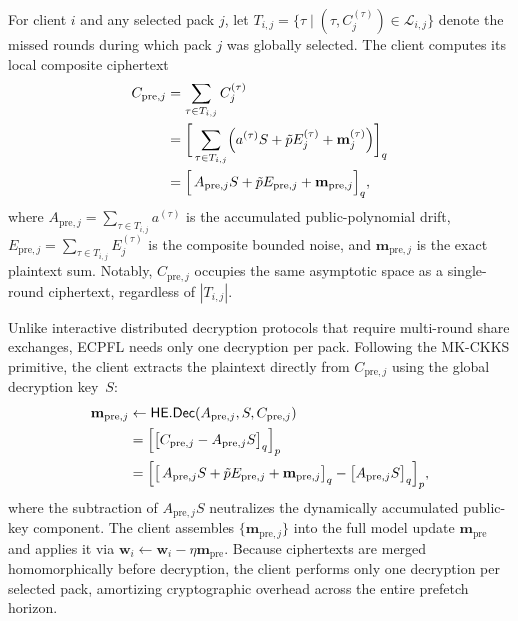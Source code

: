 \documentclass[10pt,conference]{IEEEtran}
\begin{document}
For client $i$ and any selected pack $j$, let $T_{i,j} = \{\tau \mid (\tau, C_j^{(\tau)}) \in \mathcal{L}_{i,j}\}$ denote the missed rounds during which pack $j$ was globally selected.
The client computes its local composite ciphertext
\begin{equation}
\begin{aligned}
    C_{\mathrm{pre},j} &= \sum_{\tau \in T_{i,j}} C_{j}^{(\tau)} \\
    &= \biggl[\, \sum_{\tau \in T_{i,j}} \Bigl( a^{(\tau)} S + \tilde{p} E_j^{(\tau)} + \mathbf{m}_j^{(\tau)} \Bigr) \biggr]_{q} \\
    &= \Bigl[\, A_{\mathrm{pre},j} S + \tilde{p} E_{\mathrm{pre},j} + \mathbf{m}_{\mathrm{pre}, j} \Bigr]_{q},
    \label{eq:prefetch-accumulation}
\end{aligned}
\end{equation}
where $A_{\mathrm{pre},j} = \sum_{\tau \in T_{i,j}} a^{(\tau)}$ is the accumulated public-polynomial drift, $E_{\mathrm{pre},j} = \sum_{\tau \in T_{i,j}} E_j^{(\tau)}$ is the composite bounded noise, and $\mathbf{m}_{\mathrm{pre}, j}$ is the exact plaintext sum.
Notably, $C_{\mathrm{pre},j}$ occupies the same asymptotic space as a single-round ciphertext, regardless of $|T_{i,j}|$.

Unlike interactive distributed decryption protocols that require multi-round share exchanges, \textsc{ECPFL} needs only one decryption per pack.
Following the MK-CKKS primitive, the client extracts the plaintext directly from $C_{\mathrm{pre},j}$ using the global decryption key~$S$:
\begin{equation}
\begin{aligned}
 \mathbf{m}_{\mathrm{pre},j}
& \leftarrow \mathsf{HE.Dec}(A_{\mathrm{pre},j}, S, C_{\mathrm{pre},j})\\
&= \Bigl[\bigl[ C_{\mathrm{pre},j} - A_{\mathrm{pre},j} S \bigr]_{q}\Bigr]_{p} \\
&=\Bigl[\bigl[\, A_{\mathrm{pre},j} S + \tilde{p} E_{\mathrm{pre},j} + \mathbf{m}_{\mathrm{pre},j} \bigr]_{q} - \bigl[ A_{\mathrm{pre},j} S\bigr]_q\Bigr]_p,
\end{aligned}
\label{eq:one-shot-dec}
\end{equation}
where the subtraction of $A_{\mathrm{pre},j} S$ neutralizes the dynamically accumulated public-key component.
The client assembles $\{\mathbf{m}_{\mathrm{pre},j}\}$ into the full model update $\mathbf{m}_{\mathrm{pre}}$ and applies it via $\mathbf{w}_i \leftarrow \mathbf{w}_i - \eta \mathbf{m}_{\mathrm{pre}}$.
Because ciphertexts are merged homomorphically before decryption, the client performs only one decryption per selected pack, amortizing cryptographic overhead across the entire prefetch horizon.
\end{document}
